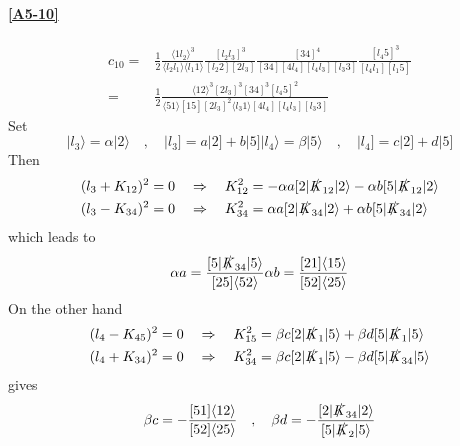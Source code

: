 \paragraph{\ref{A5-10}}
\begin{equation*}
\begin{split}
c_{10} = &
\frac{1}{2}\frac{\langle 1l_2\rangle^3}{\langle l_2 l_1 \rangle\langle l_1 1 \rangle}
\frac{[l_2 l_3]^3}{[l_2 2 ][2 l_3]}
\frac{[34]^4}{[34][4 l_4][l_4 l_3][l_3 3]}
\frac{[l_4 5]^3}{[l_4 l_1][l_1 5]}
\\
= &
\frac{1}{2}\frac{\langle 12 \rangle^3[2l_3]^3[34]^3[l_4 5 ]^2}{\langle 51 \rangle[15][2l_3]^2\langle l_3 1\rangle [4 l_4][l_4 l_3][l_3 3]}
\end{split}
\end{equation*}
Set
\begin{equation*}
|l_3\rangle = \alpha |2\rangle \quad,\quad |l_3] = a|2] + b|5]
|l_4\rangle = \beta |5\rangle \quad,\quad |l_4] = c|2]+d|5]
\end{equation*}
Then
\begin{equation*}
\begin{split}
& (l_3 + K_{12})^2 = 0 \quad\Rightarrow\quad K_{12}^2 = - \alpha a [2|\slashed{K}_{12}|2\rangle - \alpha b [5|\slashed{K}_{12}|2\rangle
\\
& (l_3 - K_{34})^2 = 0 \quad\Rightarrow\quad K_{34}^2 = \alpha a [2|\slashed{K}_{34}|2\rangle + \alpha b [5|\slashed{K}_{34}|2\rangle
\end{split}
\end{equation*}
which leads to
\begin{equation*}
\alpha a = \frac{[5|\slashed{K}_{34}|5\rangle}{[25]\langle 52\rangle}
\\
\alpha b = \frac{[21]\langle 15\rangle}{[52]\langle 25\rangle}
\end{equation*}
On the other hand
\begin{equation*}
\begin{split}
& (l_4 - K_{45})^2 = 0 \quad\Rightarrow\quad
K_{15}^2 = \beta c[2|\slashed{K}_1|5\rangle + \beta d [5|\slashed{K}_1|5\rangle
\\
& (l_4 + K_{34})^2 = 0 \quad\Rightarrow\quad
K_{34}^2 = \beta c [2|\slashed{K}_1|5\rangle - \beta d [5|\slashed{K}_{34}|5\rangle
\end{split}
\end{equation*}
gives
\begin{equation*}
\beta c = - \frac{[51]\langle 12 \rangle}{[52]\langle 25 \rangle}
\quad,\quad
\beta d = - \frac{[2| \slashed{K}_{34}|2\rangle}{[5|\slashed{K}_2|5\rangle}
\end{equation*}
